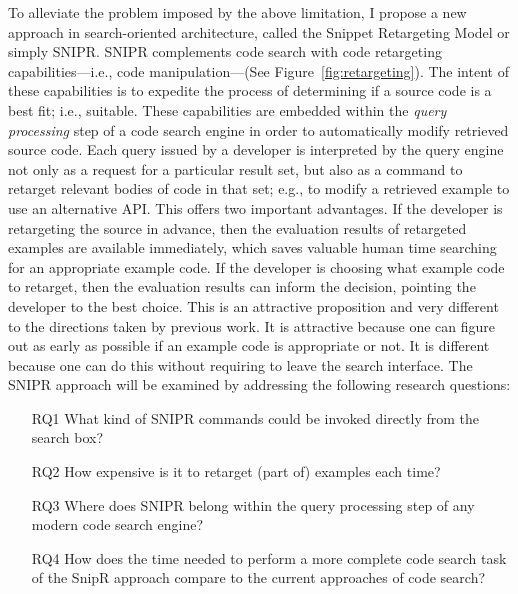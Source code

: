 \documentclass[conference]{IEEEtran}
\begin{document}
To alleviate the problem imposed by the above limitation, I propose a new approach in search-oriented architecture, called the Snippet Retargeting Model or simply \uppercase{SnipR}. \uppercase{SnipR} complements code search with code retargeting capabilities---i.e., code manipulation---(See Figure~\ref{fig:retargeting}). The intent of these capabilities is to expedite the process of determining if a source code is a best fit; i.e., suitable. These capabilities are embedded within the \emph{query processing} step of a code search engine in order to automatically modify retrieved source code. Each query issued by a developer is interpreted by the query engine not only as a request for a particular result set, but also as a command to retarget relevant bodies of code in that set; e.g., to modify a retrieved example to use an alternative API. This offers two important advantages. If the developer is retargeting the source in advance, then the evaluation results of retargeted examples are available immediately, which saves valuable human time searching for an appropriate example code. If the developer is choosing what example code to retarget, then the evaluation results can inform the decision, pointing the developer to the best choice. This is an attractive proposition and very different to the directions taken by previous work. It is attractive because one can figure out as early as possible if an example code is appropriate or not. It is different because one can do this without requiring to leave the search interface. The \uppercase{SnipR} approach will be examined by addressing the following research questions:

\begin{itemize}  
\item[RQ1] What kind of \uppercase{SnipR} commands could be invoked directly from the search box?
\item[RQ2] How expensive is it to retarget (part of) examples each time?
\item[RQ3] Where does \uppercase{SnipR} belong within the query processing step of any modern code search engine?
\item[RQ4] How does the time needed to perform a more complete code search task of the SnipR approach compare to the current approaches of code search? 
\end{itemize}
\end{document}
